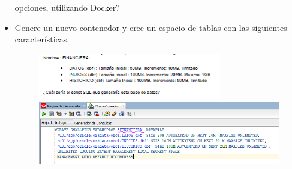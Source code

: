 \begin{itemize}
opciones, utilizando Docker?
		\item Genere un nuevo contenedor y cree un espacio de tablas con las siguientes características.
		\begin{figure}[H]
		\begin{center}
		\includegraphics[width=8cm]{./Imagenes/t3}
		\includegraphics[width=15cm]{./Imagenes/23}
		\end{center}
		\end{figure}


	\end{itemize}



